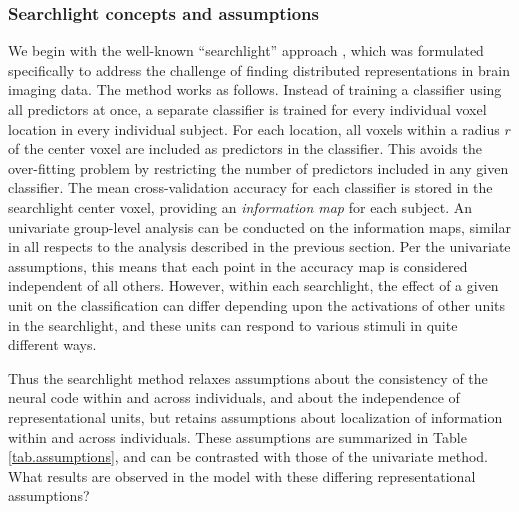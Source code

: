 \subsubsection{Searchlight concepts and assumptions}
We begin with the well-known ``searchlight'' approach \cite{kriegeskorte_information-based_2006}, which was formulated specifically to address the challenge of finding distributed representations in brain imaging data. The method works as follows. Instead of training a classifier using all predictors at once, a separate classifier is trained for every individual voxel location in every individual subject. For each location, all voxels within a radius $r$ of the center voxel are included as predictors in the classifier. This avoids the over-fitting problem by restricting the number of predictors included in any given classifier.  The mean cross-validation accuracy for each classifier is stored in the searchlight center voxel, providing an {\em information map} for each subject. An univariate group-level analysis can be conducted on the information maps, similar in all respects to the analysis described in the previous section. Per the univariate assumptions, this means that each point in the accuracy map is considered independent of all others. However, within each searchlight, the effect of a given unit on the classification can differ depending upon the activations of other units in the searchlight, and these units can respond to various stimuli in quite different ways. 

Thus the searchlight method relaxes assumptions about the consistency of the neural code within and across individuals, and about the independence of representational units, but retains assumptions about localization of information within and across individuals. These assumptions are summarized in Table \ref{tab.assumptions}, and can be contrasted with those of the univariate method. What results are observed in the model with these differing representational assumptions?


